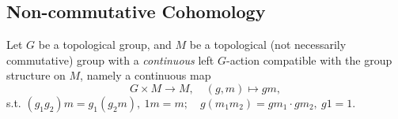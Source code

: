 










\subsection{Non-commutative Cohomology}
Let $G$ be a topological group, and $M$ be a topological (not necessarily commutative) group with a \textit{continuous} left $G$-action compatible with the group structure on $M$, namely a continuous map\[G\times M\to M,\quad (g, m)\mapsto gm,\]
s.t. \(
    (g_1g_2)m = g_1(g_2m),\ 1m = m;\quad
    g(m_1m_2) = gm_1\cdot gm_2,\ g1 = 1.
\)

